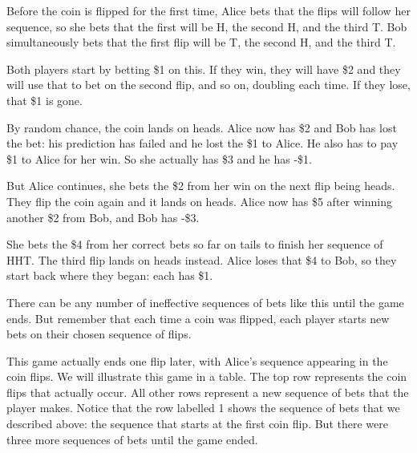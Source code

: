\documentclass[english,12pt,a4paper,final]{article}
\begin{document}
Before the coin is flipped for the first time, Alice bets that the flips will follow her sequence, so she bets that the first will be H, the second H, and the third T. Bob simultaneously bets that the first flip will be T, the second H, and the third T. 

Both players start by betting \$1 on this. If they win, they will have \$2 and they will use that to bet on the second flip, and so on, doubling each time. If they lose, that \$1 is gone. 

By random chance, the coin lands on heads. Alice now has \$2 and Bob has lost the bet: his prediction has failed and he lost the \$1 to Alice. He also has to pay \$1 to Alice for her win. So she actually has \$3 and he has -\$1. 

But Alice continues, she bets the \$2 from her win on the next flip being heads. They flip the coin again and it lands on heads. Alice  now has \$5 after winning another \$2 from Bob, and Bob has -\$3. 

She bets the \$4 from her correct bets so far on tails to finish her sequence of HHT. The third flip lands on heads instead. Alice loses that \$4 to Bob, so they start back where they began: each has \$1.

There can be any number of ineffective sequences of bets like this until the game ends. But remember that each time a coin was flipped, each player starts new bets on their chosen sequence of flips.

This game actually ends one flip later, with Alice's sequence appearing in the coin flips. We will illustrate this game in a table. The top row represents the coin flips that actually occur. All other rows represent a new sequence of bets that the player makes. Notice that the row labelled 1 shows the sequence of bets that we described above: the sequence that starts at the first coin flip. But there were three more sequences of bets until the game ended.
\end{document}
